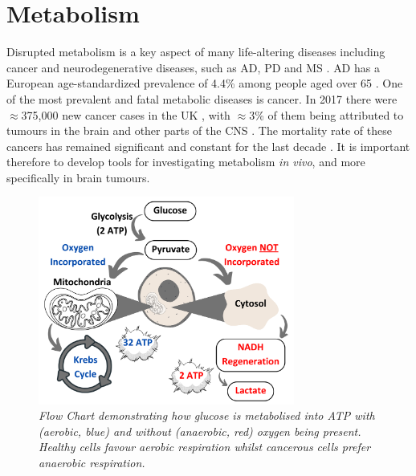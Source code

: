 \section{Metabolism}

Disrupted metabolism is a key aspect of many life-altering diseases including cancer and neurodegenerative diseases, such as \ac{AD}, \ac{PD} and \ac{MS} \cite{Gialleonardo2016TheImaging}. \ac{AD} has a European age-standardized prevalence of 4.4\% among people aged over 65 \cite{Qiu2009EpidemiologyIntervention}. One of the most prevalent and fatal metabolic diseases is cancer. In 2017 there were $\approx$375,000 new cancer cases in the UK \cite{CancerUK}, with $\approx$3\% of them being attributed to tumours in the brain and other parts of the CNS \cite{BrainUK}. The mortality rate of these cancers has remained significant and constant for the last decade \cite{BrainUK}. It is important therefore to develop tools for investigating metabolism \textit{in vivo}, and more specifically in brain tumours.

\begin{figure}
    \centering
    \includegraphics[width=0.75\textwidth]{Figures/Intro/Metabolism.png}
    \caption{\textit{Flow Chart demonstrating how glucose is metabolised into \ac{ATP} with (aerobic, blue) and without (anaerobic, red) oxygen being present. Healthy cells favour aerobic respiration whilst cancerous cells prefer anaerobic respiration.}}
    \label{fig:intro:Metabolism}
\end{figure}

